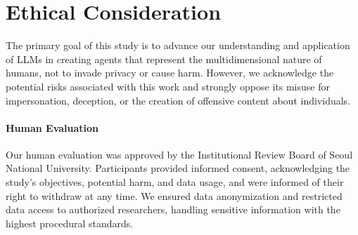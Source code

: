 \section{Ethical Consideration}
The primary goal of this study is to advance our understanding and application of LLMs in creating agents that represent the multidimensional nature of humans, not to invade privacy or cause harm. However, we acknowledge the potential risks associated with this work and strongly oppose its misuse for impersonation, deception, or the creation of offensive content about individuals.

\paragraph{Human Evaluation}
Our human evaluation was approved by the Institutional Review Board of Seoul National University. Participants provided informed consent, acknowledging the study's objectives, potential harm, and data usage, and were informed of their right to withdraw at any time. We ensured data anonymization and restricted data access to authorized researchers, handling sensitive information with the highest procedural standards.







